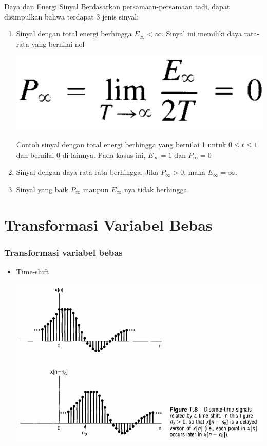 \documentclass[pdflatex,compress,mathserif]{beamer}
\begin{document}
\begin{frame}{Daya dan Energi Sinyal}
	Berdasarkan persamaan-persamaan tadi, dapat disimpulkan bahwa terdapat 3 jenis sinyal:
	\begin{enumerate}
		\item Sinyal dengan total energi berhingga $ E_{\infty} < \infty $. Sinyal ini memiliki daya rata-rata yang bernilai nol
		\begin{center}
			\includegraphics[width=0.3\linewidth]{img/img17}
		\end{center}
		Contoh sinyal dengan total energi berhingga yang bernilai 1 untuk $ 0 \leq t \leq 1 $ dan bernilai 0 di lainnya. Pada kasus ini, $ E_{\infty} = 1 $ dan $ P_{\infty} = 0 $
		\item Sinyal dengan daya rata-rata berhingga. Jika $ P_{\infty} > 0 $, maka $ E_{\infty} = \infty $.
		\item Sinyal yang baik $ P_{\infty} $ maupun $ E_{\infty} $ nya tidak berhingga.
	\end{enumerate}
\end{frame}

\section{Transformasi Variabel Bebas}

\begin{frame}
	\frametitle{Transformasi variabel bebas}
	\begin{itemize}
		\item Time-shift
		\begin{center}
			\includegraphics[width=0.8\linewidth]{img/img18}
		\end{center}
	\end{itemize}
\end{frame}
\end{document}
